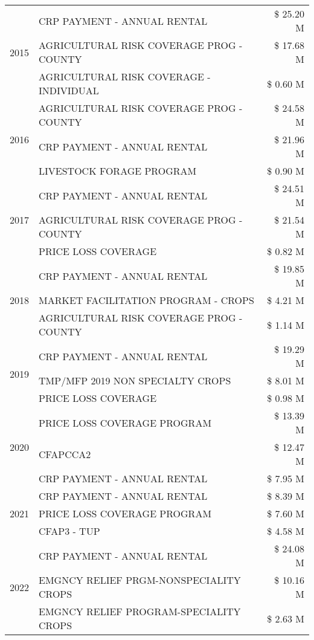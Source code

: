 \begin{tabular}{llr}
\cline{1-3}
\multirow[t]{3}{*}{2015} & CRP PAYMENT - ANNUAL RENTAL & \$ 25.20 M \\
 & AGRICULTURAL RISK COVERAGE PROG - COUNTY & \$ 17.68 M \\
 & AGRICULTURAL RISK COVERAGE - INDIVIDUAL & \$ 0.60 M \\
\cline{1-3}
\multirow[t]{3}{*}{2016} & AGRICULTURAL RISK COVERAGE PROG - COUNTY & \$ 24.58 M \\
 & CRP PAYMENT - ANNUAL RENTAL & \$ 21.96 M \\
 & LIVESTOCK FORAGE PROGRAM & \$ 0.90 M \\
\cline{1-3}
\multirow[t]{3}{*}{2017} & CRP PAYMENT - ANNUAL RENTAL & \$ 24.51 M \\
 & AGRICULTURAL RISK COVERAGE PROG - COUNTY & \$ 21.54 M \\
 & PRICE LOSS COVERAGE & \$ 0.82 M \\
\cline{1-3}
\multirow[t]{3}{*}{2018} & CRP PAYMENT - ANNUAL RENTAL & \$ 19.85 M \\
 & MARKET FACILITATION PROGRAM - CROPS & \$ 4.21 M \\
 & AGRICULTURAL RISK COVERAGE PROG - COUNTY & \$ 1.14 M \\
\cline{1-3}
\multirow[t]{3}{*}{2019} & CRP PAYMENT - ANNUAL RENTAL & \$ 19.29 M \\
 & TMP/MFP 2019 NON SPECIALTY CROPS & \$ 8.01 M \\
 & PRICE LOSS COVERAGE & \$ 0.98 M \\
\cline{1-3}
\multirow[t]{3}{*}{2020} & PRICE LOSS COVERAGE PROGRAM & \$ 13.39 M \\
 & CFAPCCA2 & \$ 12.47 M \\
 & CRP PAYMENT - ANNUAL RENTAL & \$ 7.95 M \\
\cline{1-3}
\multirow[t]{3}{*}{2021} & CRP PAYMENT - ANNUAL RENTAL & \$ 8.39 M \\
 & PRICE LOSS COVERAGE PROGRAM & \$ 7.60 M \\
 & CFAP3 - TUP & \$ 4.58 M \\
\cline{1-3}
\multirow[t]{3}{*}{2022} & CRP PAYMENT - ANNUAL RENTAL & \$ 24.08 M \\
 & EMGNCY RELIEF PRGM-NONSPECIALITY CROPS & \$ 10.16 M \\
 & EMGNCY RELIEF PROGRAM-SPECIALITY CROPS & \$ 2.63 M \\
\cline{1-3}
\bottomrule
\end{tabular}
